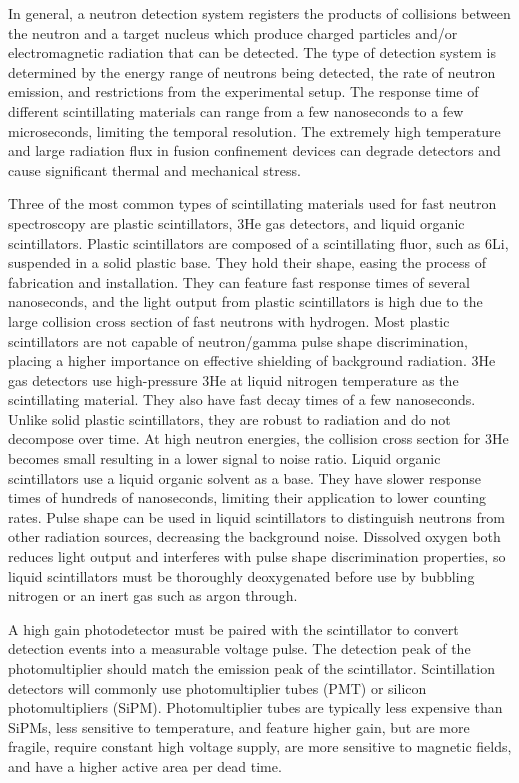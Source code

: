 \documentclass{jpp}
\begin{document}
In general, a neutron detection system registers the products of collisions between the neutron and a target nucleus which produce charged particles and/or electromagnetic radiation that can be detected. The type of detection system is determined by the energy range of neutrons being detected, the rate of neutron emission, and restrictions from the experimental setup. The response time of different scintillating materials can range from a few nanoseconds to a few microseconds, limiting the temporal resolution. The extremely high temperature and large radiation flux in fusion confinement devices can degrade detectors and cause significant thermal and mechanical stress.

Three of the most common types of scintillating materials used for fast neutron spectroscopy are plastic scintillators, 3He gas detectors, and liquid organic scintillators. Plastic scintillators are composed of a scintillating fluor, such as 6Li, suspended in a solid plastic base. They hold their shape, easing the process of fabrication and installation. They can feature fast response times of several nanoseconds, and the light output from plastic scintillators is high due to the large collision cross section of fast neutrons with hydrogen. Most plastic scintillators are not capable of neutron/gamma pulse shape discrimination, placing a higher importance on effective shielding of background radiation. 3He gas detectors use high-pressure 3He at liquid nitrogen temperature as the scintillating material. They also have fast decay times of a few nanoseconds. Unlike solid plastic scintillators, they are robust to radiation and do not decompose over time. At high neutron energies, the collision cross section for 3He becomes small resulting in a lower signal to noise ratio. Liquid organic scintillators use a liquid organic solvent as a base. They have slower response times of hundreds of nanoseconds, limiting their application to lower counting rates. Pulse shape can be used in liquid scintillators to distinguish neutrons from other radiation sources, decreasing the background noise. Dissolved oxygen both reduces light output and interferes with pulse shape discrimination properties, so liquid scintillators must be thoroughly deoxygenated before use by bubbling nitrogen or an inert gas such as argon through.

A high gain photodetector must be paired with the scintillator to convert detection events into a measurable voltage pulse. The detection peak of the photomultiplier should match the emission peak of the scintillator. Scintillation detectors will commonly use photomultiplier tubes (PMT) or silicon photomultipliers (SiPM). Photomultiplier tubes are typically less expensive than SiPMs, less sensitive to temperature, and feature higher gain, but are more fragile, require constant high voltage supply, are more sensitive to magnetic fields, and have a higher active area per dead time.
\end{document}
